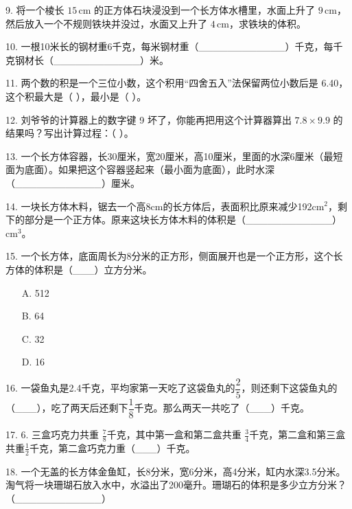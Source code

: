 \documentclass{article}
\begin{document}
\begin{CJK}{UTF8}{gbsn}
9. 将一个棱长 \(15 \, \text{cm}\) 的正方体石块浸没到一个长方体水槽里，水面上升了 \(9 \, \text{cm}\)，然后放入一个不规则铁块并没过，水面又上升了 \(4 \, \text{cm}\)，求铁块的体积。 \par
\vspace{0.2cm}
10. 一根10米长的钢材重6千克，每米钢材重（\_\_\_\_\_\_\_\_\_\_\_\_）千克，每千克钢材长（\_\_\_\_\_\_\_\_\_\_\_\_）米。\par
\vspace{0.2cm}
11.  两个数的积是一个三位小数，这个积用“四舍五入”法保留两位小数后是 6.40，这个积最大是（ \quad ），最小是（ \quad ）。 \par
\vspace{0.2cm}
12. 刘爷爷的计算器上的数字键 9 坏了，你能再把用这个计算器算出 \(7.8 \times 9.9\) 的结果吗？写出计算过程：（ \quad ）。\par
\vspace{0.2cm}
13. 一个长方体容器，长30厘米，宽20厘米，高10厘米，里面的水深6厘米（最短面为底面）。如果把这个容器竖起来（最小面为底面），此时水深（\_\_\_\_\_\_\_\_\_\_\_\_）厘米。\par
\vspace{0.2cm}
14. 一块长方体木料，锯去一个高8cm的长方体后，表面积比原来减少192cm$^2$，剩下的部分是一个正方体。原来这块长方体木料的体积是（\_\_\_\_\_\_\_\_\_\_\_\_）cm$^3$。\par
\vspace{0.2cm}

15. 一个长方体，底面周长为8分米的正方形，侧面展开也是一个正方形，这个长方体的体积是（\_\_\_）立方分米。

\begin{itemize}
  \item[A.] 512
  \item[B.] 64
  \item[C.] 32
  \item[D.] 16
\end{itemize}

16. 一袋鱼丸是2.4千克，平均家第一天吃了这袋鱼丸的$\dfrac{2}{5}$，则还剩下这袋鱼丸的（\_\_\_），吃了两天后还剩下$\dfrac{1}{8}$千克。那么两天一共吃了（\_\_\_）千克。 \par
\vspace{0.2cm}
17. 6. 三盒巧克力共重 $\frac{7}{8}$千克，其中第一盒和第二盒共重 $\frac{3}{4}$千克，第二盒和第三盒共重$\frac{1}{2}$千克，第二盒巧克力重（\_\_\_）千克。 \par
\vspace{0.2cm}


18. 一个无盖的长方体金鱼缸，长8分米，宽6分米，高4分米，缸内水深3.5分米。淘气将一块珊瑚石放入水中，水溢出了200毫升。珊瑚石的体积是多少立方分米？（\_\_\_\_\_\_\_\_\_\_\_\_） \par


\end{CJK}
\end{document}
